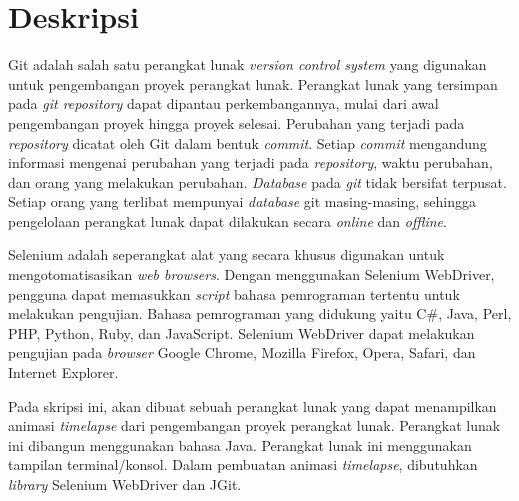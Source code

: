 \documentclass[a4paper,twoside]{article}
\begin{document}
\title{\@judultopik}
\author{\nama \textendash \@npm} 

\newcommand{\nama}{Billy Adiwijaya}
\newcommand{\@npm}{2015730053}
\newcommand{\@judultopik}{Pembangkit Timelapse Pengembangan Proyek Perangkat Lunak Berbasis Web} %
\newcommand{\jumpemb}{1} %
\newcommand{\tanggal}{03/09/2018}


\maketitle


\section{Deskripsi}
 Git adalah salah satu perangkat lunak \textit{version control system} yang digunakan untuk pengembangan proyek perangkat lunak. Perangkat lunak yang tersimpan pada \textit{git repository} dapat dipantau perkembangannya, mulai dari awal pengembangan proyek hingga proyek selesai. Perubahan yang terjadi pada \textit{repository} dicatat oleh Git dalam bentuk \textit{commit}. Setiap \textit{commit} mengandung informasi mengenai perubahan yang terjadi pada \textit{repository}, waktu perubahan, dan orang yang melakukan perubahan. \textit{Database} pada \textit{git} tidak bersifat terpusat. Setiap orang yang terlibat mempunyai \textit{database} git masing-masing, sehingga pengelolaan perangkat lunak dapat dilakukan secara \textit{online} dan \textit{offline}. 

Selenium adalah seperangkat alat yang secara khusus digunakan untuk mengotomatisasikan \textit{web browsers}. Dengan menggunakan Selenium WebDriver, pengguna dapat memasukkan \textit{script} bahasa pemrograman tertentu untuk melakukan pengujian. Bahasa pemrograman yang didukung yaitu C\#, Java, Perl, PHP, Python, Ruby, dan JavaScript. Selenium WebDriver dapat melakukan pengujian pada \textit{browser} Google Chrome, Mozilla Firefox, Opera, Safari, dan Internet Explorer.  
  
Pada skripsi ini, akan dibuat sebuah perangkat lunak yang dapat menampilkan animasi \textit{timelapse} dari pengembangan proyek perangkat lunak. Perangkat lunak ini dibangun menggunakan bahasa Java. Perangkat lunak ini menggunakan tampilan terminal/konsol. Dalam pembuatan animasi \textit{timelapse}, dibutuhkan \textit{library} Selenium WebDriver dan JGit. 
\end{document}
